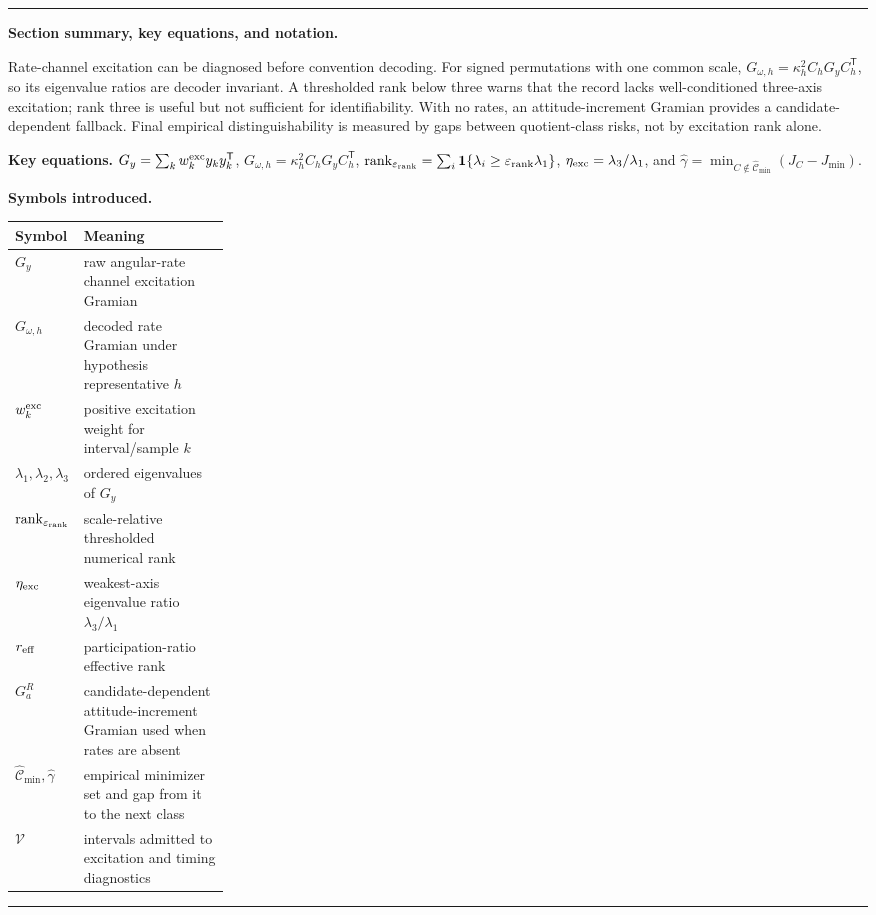 \documentclass[11pt]{article}
\newenvironment{sectionrecap}
{\par\medskip\begingroup\small\noindent\rule{\linewidth}{0.4pt}\par
\smallskip\noindent\textbf{Section summary, key equations, and notation.}\par\smallskip}
{\par\smallskip\noindent\rule{\linewidth}{0.4pt}\par\endgroup\medskip}
\begin{document}
    \begin{sectionrecap}
        Rate-channel excitation can be diagnosed before convention decoding. For signed
        permutations with one common scale, $G_{\omega,h}=\kappa_h^2C_hG_yC_h^{\mathsf T}$, so its
        eigenvalue ratios are decoder invariant. A thresholded rank below three warns that the
        record lacks well-conditioned three-axis excitation; rank three is useful but not
        sufficient for identifiability. With no rates, an attitude-increment Gramian provides a
        candidate-dependent fallback. Final empirical distinguishability is measured by gaps
        between quotient-class risks, not by excitation rank alone.

        \noindent\textbf{Key equations.}
        \(G_y=\sum_k w_k^{\rm exc}y_ky_k^{\mathsf T}\),
        \(G_{\omega,h}=\kappa_h^2C_hG_yC_h^{\mathsf T}\),
        \(\operatorname{rank}_{\varepsilon_{\rm rank}}=\sum_i\mathbf1\{\lambda_i\ge\varepsilon_{\rm rank}\lambda_1\}\),
        \(\eta_{\rm exc}=\lambda_3/\lambda_1\), and
        \(\widehat\gamma=\min_{C\notin\widehat{\mathcal C}_{\min}}(J_C-J_{\min})\).

        \noindent\textbf{Symbols introduced.}
        \par\noindent\begin{tabularx}{\linewidth}{@{}p{0.25\linewidth}Y@{}}
\toprule
Symbol & Meaning \\
\midrule
$G_y$ & raw angular-rate channel excitation Gramian \\
$G_{\omega,h}$ & decoded rate Gramian under hypothesis representative $h$ \\
$w_k^{\rm exc}$ & positive excitation weight for interval/sample $k$ \\
$\lambda_1,\lambda_2,\lambda_3$ & ordered eigenvalues of $G_y$ \\
$\operatorname{rank}_{\varepsilon_{\rm rank}}$ & scale-relative thresholded numerical rank \\
$\eta_{\rm exc}$ & weakest-axis eigenvalue ratio $\lambda_3/\lambda_1$ \\
$r_{\rm eff}$ & participation-ratio effective rank \\
$G^R_a$ & candidate-dependent attitude-increment Gramian used when rates are absent \\
$\widehat{\mathcal C}_{\min},\widehat\gamma$ & empirical minimizer set and gap from it to the next class \\
$\mathcal V$ & intervals admitted to excitation and timing diagnostics \\
\bottomrule
        \end{tabularx}
    \end{sectionrecap}
\end{document}
